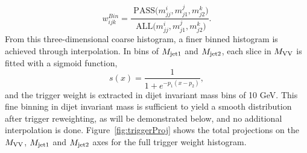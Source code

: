 \begin{equation*}
w^{Bin}_{ijk}= \frac{\textrm{ PASS}\big(m_{jj}^i,m_{j1}^j,m_{j2}^k\big) }{\textrm{ ALL}\big(m_{jj}^i,m_{j1}^j,m_{j2}^k\big)}.
\end{equation*}
From this three-dimensional coarse histogram, a finer binned histogram is achieved through interpolation. In bins of $M_{\rm jet1}$ and $M_{\rm jet2}$, each slice in $M_{\rm VV}$ is fitted with a sigmoid function,
\begin{equation*}
s(x)=\frac{1}{1+e^{-p_1(x-p_2)}},
\end{equation*}
and the trigger weight is extracted in dijet invariant mass bins of 10 GeV. This fine binning in dijet invariant mass is sufficient to yield a smooth distribution after trigger reweighting, as will be demonstrated below, and no additional interpolation is done.
Figure~\ref{fig:triggerProj} shows the total projections on the $M_{\rm VV}$, $M_{\rm jet1}$ and $M_{\rm jet2}$ axes for the full trigger weight histogram.
